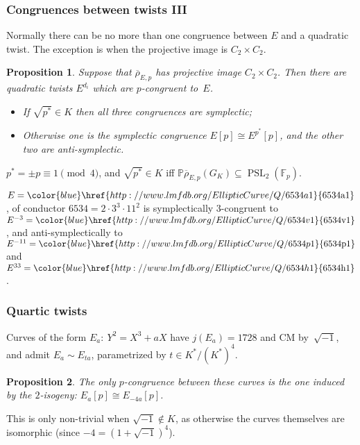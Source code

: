 \documentclass[handout]{beamer}
\newtheorem{prop}{Proposition}
\newcommand{\rhobar}{\overline{\rho}}
\newcommand{\F}{\mathbb F}
\newcommand{\PP}{\mathbb P}
\newcommand{\PSL}{\operatorname{PSL}}
\newcommand{\lmfdbec}[3]{\color{blue}\href{http://www.lmfdb.org/EllipticCurve/Q/#1#2#3}{{\text{\rm#1#2#3}}}}
\newcommand{\high}[1]{\emph{\color{blue}{#1}}}
\begin{document}
\begin{frame}\frametitle{Congruences between twists III}
  Normally there can be no more than one congruence between $E$ and a
  quadratic twist.  The exception is when the projective image is
  $C_2\times C_2$.

  \pause\medskip

  \begin{prop}
    Suppose that $\rhobar_{E,p}$ has projective image $C_2\times
    C_2$.  Then there are \high{three} quadratic twists $E^{d_i}$
    which are $p$-congruent to~$E$.
  \begin{itemize}
  \item If $\sqrt{p^*}\in K$ then all three congruences are symplectic;
    \item Otherwise one is the symplectic congruence $E[p]\cong
      E^{p^*}[p]$, and the other two are anti-symplectic.
  \end{itemize}
  \end{prop}
  $p^*=\pm p\equiv1\pmod4$, and $\sqrt{p^*}\in K$ iff
  $\PP\rhobar_{E,p}(G_K)\subseteq\PSL_2(\F_p)$.

  \pause\medskip

  \begin{example}
  $E=\lmfdbec{6534}{a}{1}$, of conductor $6534=2\cdot3^3\cdot11^2$ is
  symplectically $3$-congruent to $E^{-3}=\lmfdbec{6534}{v}{1}$, and
  anti-symplectically to $E^{-11}=\lmfdbec{6534}{p}{1}$ and
  $E^{33}=\lmfdbec{6534}{h}{1}$.
  \end{example}
  
\end{frame}

\begin{frame}\frametitle{Quartic twists}
  Curves of the form $E_a:\ Y^2=X^3+aX$ have $j(E_a)=1728$ and CM
  by~$\sqrt{-1}$, and admit \high{quartic twists} $E_a\sim E_{ta}$,
  parametrized by $t\in K^*/(K^*)^4$.

  \pause\medskip

  \begin{prop}
  The only $p$-congruence between these curves is the one induced by
  the $2$-isogeny: $E_a[p]\cong E_{-4a}[p]$.
  \end{prop}
  \pause\medskip

  This is only non-trivial when $\sqrt{-1}\notin K$, as otherwise the
  curves themselves are isomorphic (since $-4=(1+\sqrt{-1})^4$).

\end{frame}
\end{document}

